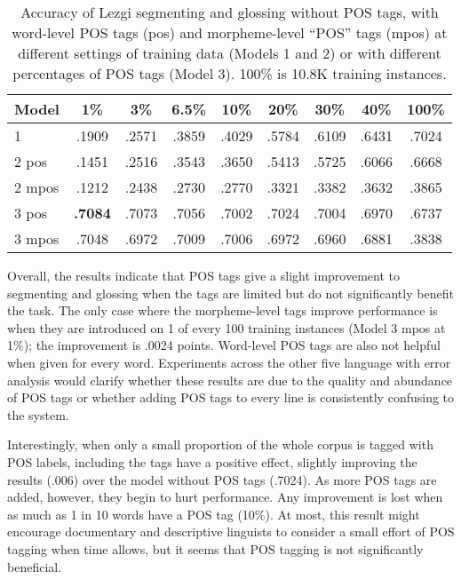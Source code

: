 \begin{table}[]
    \centering
    \begin{tabular}{l|cccccccc}
       \textbf{Model} & \textbf{1\%} & \textbf{3\%} & \textbf{6.5\%} & \textbf{10\%} & \textbf{20\%} & \textbf{30\%} & \textbf{40\%} & \textbf{100\%} \\
      \hline
       1       & .1909 & .2571 & .3859 & .4029 & .5784 & .6109 & .6431 & .7024   \\
       \hline
       2 pos   & .1451 & .2516 & .3543 & .3650 & .5413 & .5725 & .6066 & .6668  \\
       2 mpos  & .1212 & .2438 & .2730 & .2770 & .3321 & .3382 & .3632 & .3865  \\
       \hline
       3 pos   & \textbf{.7084} & .7073 & .7056 & .7002 & .7024 & .7004 & .6970 & .6737  \\
       3 mpos  & .7048 & .6972  & .7009 & .7006 & .6972 & .6960 & .6881 & .3838  \\
    \end{tabular}
    \caption[Segmenting and Glossing with/out POS tags]{Accuracy of Lezgi segmenting and glossing without POS tags, with word-level POS tags (pos) and morpheme-level ``POS'' tags (mpos)  at different settings of training data (Models 1 and 2) or with different percentages of POS tags (Model 3). 100\% is 10.8K training instances.}
    \label{tab:POSSG}
\end{table}

Overall, the results indicate that POS tags give a slight improvement to segmenting and glossing when the tags are limited but do not significantly benefit the task. The only case where the morpheme-level tags improve performance is when they are introduced on 1 of every 100 training instances (Model 3 mpos at 1\%); the improvement is .0024 points. Word-level POS tags are also not helpful when given for every word. Experiments across the other five language with error analysis would clarify whether these results are due to the quality and abundance of POS tags or whether adding POS tags to every line is consistently confusing to the system. 

Interestingly, when only a small proportion of the whole corpus is tagged with POS labels, including the tags have a positive effect, slightly improving the results (.006) over the model without POS tags (.7024). As more POS tags are added, however, they begin to hurt performance. Any improvement is lost when as much as 1 in 10 words have a POS tag (10\%). At most, this result might encourage documentary and descriptive linguists to consider a small effort of POS tagging when time allows, but it seems that POS tagging is not significantly beneficial.
